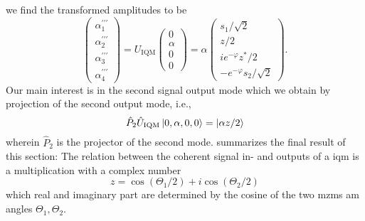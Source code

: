 we find the transformed amplitudes to be
\begin{equation}
	\begin{pmatrix}
		\alpha_1^{\prime\prime\prime} \\
		\alpha_2^{\prime\prime\prime} \\
		\alpha_3^{\prime\prime\prime} \\
		\alpha_4^{\prime\prime\prime}
	\end{pmatrix}
	=
	U_\text{IQM}
	\begin{pmatrix}
		0 \\
		\alpha \\
		0 \\
		0
	\end{pmatrix}
	=
	\alpha
	\begin{pmatrix}
		s_1/\sqrt{2} \\
		z/2 \\
		ie^{-\varphi}z^*/2 \\
		-e^{-\varphi}s_2/\sqrt{2}
	\end{pmatrix}
	.
\end{equation}
Our main interest is in the second signal output mode which we obtain by projection of the second output mode, i.e.,
\begin{equation}
	\hat{P}_2
	\hat{U}_\text{IQM}
	\ket{0,\alpha,0,0}
	=
	\ket{\alpha z/2}
	\label{eq:iqm_state}
\end{equation}
wherein $\hat{P}_2$ is the projector of the second mode.
 summarizes the final result of this section: The relation between the coherent signal in- and outputs of a \gls{iqm} is a multiplication with a complex number
\begin{equation}
	z
	=
	\cos(\Theta_1/2)
	+
	i\cos(\Theta_2/2)
\end{equation}
which real and imaginary part are determined by the cosine of the two \gls{mzm}s \gls{am} angles $\Theta_1,\Theta_2$.